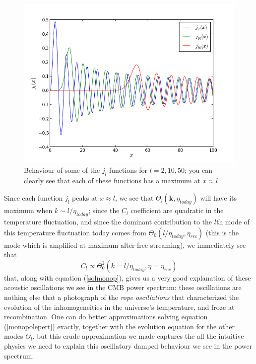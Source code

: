 \begin{figure}
\begin{center}
\includegraphics[scale=0.7]{Fourier/bessel.png}
\end{center}
\caption{Behaviour of some of the $j_l$ functions for $l=2,10,50$; you can clearly see that each of these functions has a maximum at $x\approx l$}
\label{bess}
\end{figure}
Since each function $j_l$ peaks at $x\approx l$, we see that $\Theta_l(\mathbf{k},\eta_{today})$ will have its maximum when $k\sim l/\eta_{today}$; since the $C_l$ coefficient are quadratic in the temperature fluctuation, and since the dominant contribution to the $l$th mode of this temperature fluctuation today comes from $\Theta_0(l/\eta_{today},\eta_{rec})$ (this is the mode which is amplified at maximum after free streaming), we immediately see that 
\begin{equation}
C_l\propto \Theta_0^2(k=l/\eta_{today},\eta=\eta_{rec})
\end{equation}
that, along with equation (\ref{solmonop}), gives us a very good explanation of these acoustic oscillations we see in the CMB power spectrum: these oscillations are nothing else that a photograph of the \textit{rope oscillations} that characterized the evolution of the inhomogeneities in the universe's temperature, and froze at recombination. One can do better approximations solving equation (\ref{monopolepert}) exactly, together with the evolution equation for the other modes $\Theta_l$, but this crude approximation we made captures the all the intuitive physics we need to explain this oscillatory damped behaviour we see in the power spectrum. 


